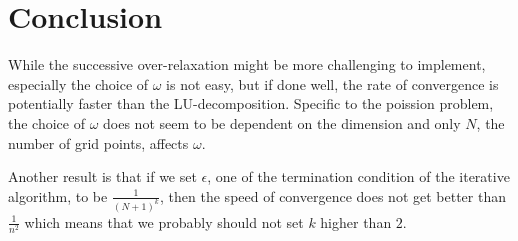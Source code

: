 \section{Conclusion}

While the successive over-relaxation might be more challenging to implement, especially the choice of \(\omega\) is not easy, but if done well, the rate of convergence is potentially faster than the LU-decomposition. Specific to the poission problem, the choice of \(\omega\) does not seem to be dependent on the dimension and only \(N\), the number of grid points, affects \(\omega\).

Another result is that if we set \(\epsilon\), one of the termination condition of the iterative algorithm, to be \(\frac{1}{(N + 1)^k}\), then the speed of convergence does not get better than \(\frac{1}{n^2}\) which means that we probably should not set \(k\) higher than \(2\).